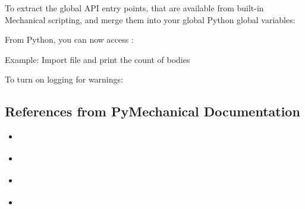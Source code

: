 \documentclass[9pt,landscape]{article}
\begin{document}
\begin{multicols}{3}

To extract the global API entry points, that are available from built-in Mechanical scripting, and merge them into your global Python global variables:


From Python, you can now access : 
 


Example: Import file and print the count of bodies


To turn on logging for warnings:


\subsection{References from PyMechanical Documentation}
\begin{itemize}
    \item \href{https://mechanical.docs.pyansys.com/version/stable/getting_started/index.html}{\color{blue}{Getting Started}}
    \item \href{https://mechanical.docs.pyansys.com/version/stable/examples/index.html}{\color{blue}{Examples}}
    \item \href{https://mechanical.docs.pyansys.com/version/stable/api/index.html}{\color{blue}{API Reference}}
    \item \href{https://ansyshelp.ansys.com/account/secured?returnurl=/Views/Secured/corp/v231/en/act_script/act_script.html}{\color{blue}{Scripting in Mechanical}}
\end{itemize}
\end{multicols}
\end{document}
